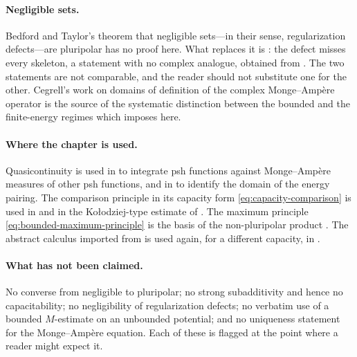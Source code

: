\paragraph{Negligible sets.}  Bedford and Taylor's theorem that negligible
sets---in their sense, regularization defects---are pluripolar
\cite{BT82} has no proof here.  What replaces it is
: the defect misses every skeleton, a
statement with no complex analogue, obtained from
.  The two statements are not comparable, and
the reader should not substitute one for the other.  Cegrell's work on
domains of definition of the complex Monge--Amp\`ere operator
\cite{Ceg98,Ceg04} is the source of the systematic distinction between the
bounded and the finite-energy regimes which
 imposes here.

\paragraph{Where the chapter is used.}  Quasicontinuity is used in
 to integrate psh functions against Monge--Amp\`ere
measures of other psh functions, and in
 to identify the domain of the energy
pairing.  The comparison principle in its capacity form
\eqref{eq:capacity-comparison} is used in
 and in the Ko\l odziej-type estimate
 of .  The
maximum principle \eqref{eq:bounded-maximum-principle} is the basis of the
non-pluripolar product .  The abstract calculus
imported from  is used again, for a different
capacity, in .

\paragraph{What has not been claimed.}  No converse from negligible to
pluripolar; no strong subadditivity and hence no capacitability; no
negligibility of regularization defects; no verbatim use of a bounded
$M$-estimate on an unbounded potential; and no uniqueness statement for the
Monge--Amp\`ere equation.  Each of these is flagged at the point where a
reader might expect it.
